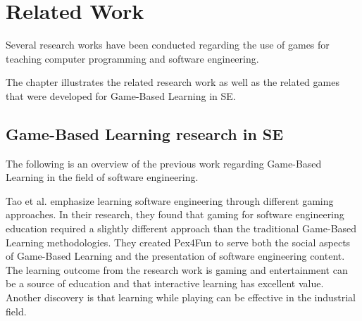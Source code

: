 \section[Related Work]{Related Work}
\label{sec:Related Work}

Several research works have been conducted regarding the use of games for teaching computer programming and software engineering.

The chapter illustrates the related research work as well as the related games that were developed for Game-Based Learning in SE.

\subsection{Game-Based Learning research in SE}
The following is an overview of the previous work regarding Game-Based Learning in the field of software engineering.

Tao et al. \cite{educational} emphasize learning software engineering through different gaming approaches. In their research, they found that gaming for software engineering education required a slightly different approach than the traditional Game-Based Learning methodologies. They created Pex4Fun to serve both the social aspects of Game-Based Learning and the presentation of software engineering content. The learning outcome from the research work is gaming and entertainment can be a source of education and that interactive learning has excellent value. Another discovery is that learning while playing can be effective in the industrial field.

